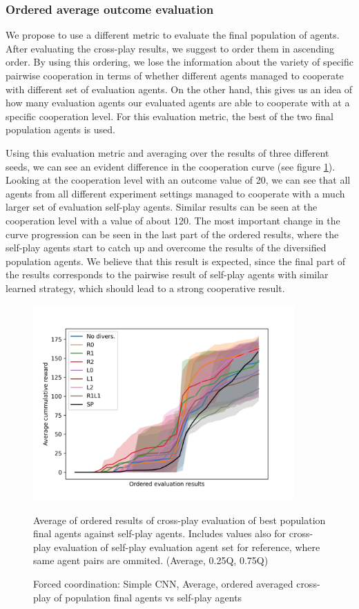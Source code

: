 \subsubsection{Ordered average outcome evaluation}\label{OrderedEvaluation}
We propose to use a different metric to evaluate the final population of agents.
After evaluating the cross-play results, we suggest to order them in ascending order.
By using this ordering, we lose the information about the variety of specific pairwise cooperation in terms of whether different agents managed to cooperate with different set of evaluation agents.
On the other hand, this gives us an idea of how many evaluation agents our evaluated agents are able to cooperate with at a specific cooperation level.
For this evaluation metric, the best of the two final population agents is used.

Using this evaluation metric and averaging over the results of three different seeds, we can see an evident difference in the cooperation curve (see figure \ref{SimpleCNNOrderedAvg}).
Looking at the cooperation level with an outcome value of 20, we can see that all agents from all different experiment settings managed to cooperate with a much larger set of evaluation self-play agents.
Similar results can be seen at the cooperation level with a value of about 120.
The most important change in the curve progression can be seen in the last part of the ordered results, where the self-play agents start to catch up and overcome the results of the diversified population agents.
We believe that this result is expected, since the final part of the results corresponds to the pairwise result of self-play agents with similar learned strategy, which should lead to a strong cooperative result.

\begin{figure}[!ht]
    \centering
    \includegraphics*[width=10cm]{../img/SimpleCNNOrderedAvg.png}

    \caption{Forced coordination: Simple CNN, Average, ordered averaged cross-play of population final agents vs self-play agents}
    \label{SimpleCNNOrderedAvg}
    \medskip
    \small 
    Average of ordered results of cross-play evaluation of best population final agents against self-play agents.
    Includes values also for cross-play evaluation of self-play evaluation agent set for reference, where same agent pairs are ommited.
    (Average, 0.25Q, 0.75Q)

\end{figure}

